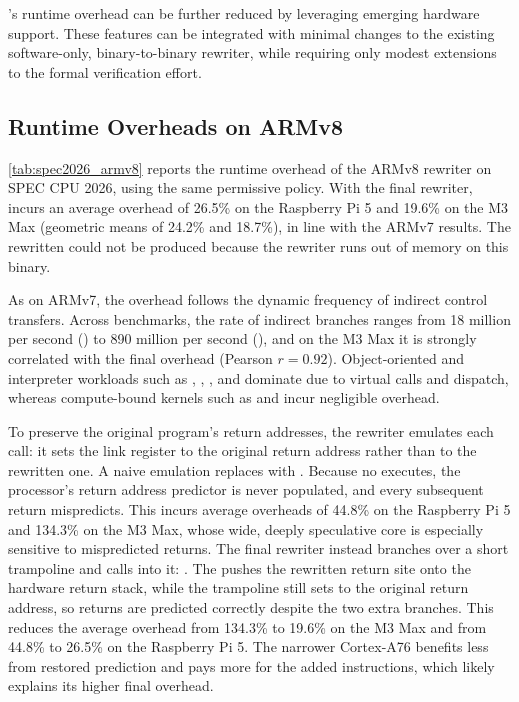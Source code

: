 \pname’s runtime overhead can be further reduced by leveraging emerging hardware support. These features can be integrated with minimal changes to the existing software-only, binary-to-binary rewriter, while requiring only modest extensions to the formal verification effort.




\subsection{Runtime Overheads on ARMv8}

\autoref{tab:spec2026_armv8} reports the runtime overhead of the ARMv8 rewriter on SPEC CPU 2026, using the same permissive policy.
With the final rewriter, \pname incurs an average overhead of 26.5\% on the Raspberry Pi 5 and 19.6\% on the M3 Max (geometric means of 24.2\% and 18.7\%), in line with the ARMv7 results.
The rewritten  could not be produced because the rewriter runs out of memory on this binary.

As on ARMv7, the overhead follows the dynamic frequency of indirect control transfers.
Across benchmarks, the rate of indirect branches ranges from 18 million per second () to 890 million per second (), and on the M3 Max it is strongly correlated with the final overhead (Pearson $r = 0.92$).
Object-oriented and interpreter workloads such as , , , and  dominate due to virtual calls and dispatch, whereas compute-bound kernels such as  and  incur negligible overhead.

To preserve the original program's return addresses, the rewriter emulates each call: it sets the link register to the original return address rather than to the rewritten one.
A naive emulation replaces  with .
Because no  executes, the processor's return address predictor is never populated, and every subsequent return mispredicts.
This incurs average overheads of 44.8\% on the Raspberry Pi 5 and 134.3\% on the M3 Max, whose wide, deeply speculative core is especially sensitive to mispredicted returns.
The final rewriter instead branches over a short trampoline and calls into it:
.
The  pushes the rewritten return site onto the hardware return stack, while the trampoline still sets  to the original return address, so returns are predicted correctly despite the two extra branches.
This reduces the average overhead from 134.3\% to 19.6\% on the M3 Max and from 44.8\% to 26.5\% on the Raspberry Pi 5.
The narrower Cortex-A76 benefits less from restored prediction and pays more for the added instructions, which likely explains its higher final overhead.

